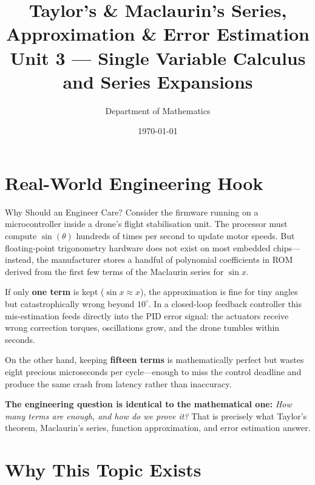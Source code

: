 \documentclass[12pt,a4paper]{article}
\title{\textbf{Taylor's \& Maclaurin's Series, Approximation \& Error Estimation} \\ \large Unit 3 --- Single Variable Calculus and Series Expansions}
\author{Department of Mathematics}
\date{\today}
\begin{document}
\maketitle
\tableofcontents
\newpage

\section{Real-World Engineering Hook}

\begin{curiositybox}{Why Should an Engineer Care?}
Consider the firmware running on a microcontroller inside a drone's flight stabilisation unit.
The processor must compute \(\sin(\theta)\) hundreds of times per second to update motor speeds.
But floating-point trigonometry hardware does not exist on most embedded chips---instead, the
manufacturer stores a handful of polynomial coefficients in ROM derived from the first few terms
of the Maclaurin series for \(\sin x\).

If only \textbf{one term} is kept (\(\sin x \approx x\)), the approximation is fine for tiny
angles but catastrophically wrong beyond \(10^{\circ}\).
In a closed-loop feedback controller this mis-estimation feeds directly into the PID error signal:
the actuators receive wrong correction torques, oscillations grow, and the drone tumbles within
seconds.

On the other hand, keeping \textbf{fifteen terms} is mathematically perfect but wastes eight
precious microseconds per cycle---enough to miss the control deadline and produce the same crash
from latency rather than inaccuracy.

\medskip
\textbf{The engineering question is identical to the mathematical one:}
\emph{How many terms are enough, and how do we prove it?}
That is precisely what Taylor's theorem, Maclaurin's series, function approximation, and
error estimation answer.
\end{curiositybox}

\section{Why This Topic Exists}
\end{document}

